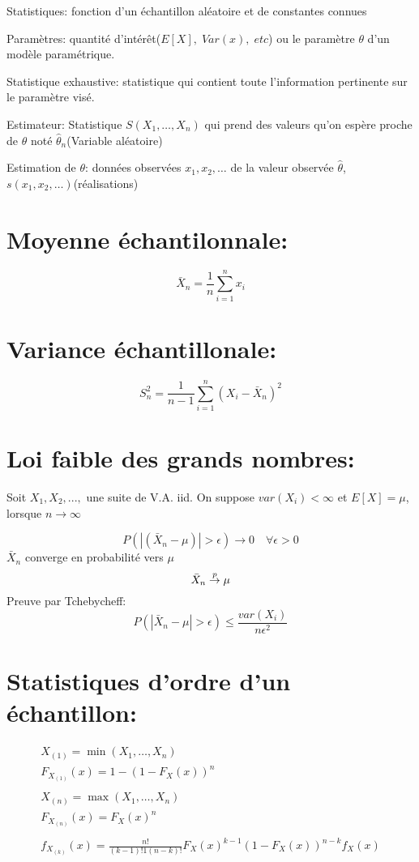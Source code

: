 \documentclass[]{book}
\theoremstyle{definition}
\theoremstyle{definition}
\theoremstyle{definition}
\theoremstyle{remark}
\begin{document}
Statistiques: fonction d'un échantillon aléatoire et de constantes
connues

Paramètres: quantité d'intérêt(\(E[X],\;Var(x),\;etc\)) ou le paramètre
\(\theta\) d'un modèle paramétrique.

Statistique exhaustive: statistique qui contient toute l'information
pertinente sur le paramètre visé.

Estimateur: Statistique \(S(X_1,\dots,X_n)\) qui prend des valeurs qu'on
espère proche de \(\theta\) noté \(\hat{\theta}_n\)(Variable aléatoire)

Estimation de \(\theta\): données observées \(x_1,x_2,\dots\) de la
valeur observée \(\hat{\theta}\), \(s(x_1,x_2,\dots)\)(réalisations)

\section{Moyenne échantilonnale:}\label{moyenne-echantilonnale}

\[
\bar{X}_n=\frac{1}{n}\sum_{i=1}^n x_i
\]

\section{Variance échantillonale:}\label{variance-echantillonale}

\[
S^2_n= \frac{1}{n-1}\sum^n_{i=1}\left(X_i-\bar{X}_n\right)^2
\]

\section{Loi faible des grands
nombres:}\label{loi-faible-des-grands-nombres}

Soit \(X_1,X_2,...,\) une suite de V.A. iid. On suppose
\(var(X_i)< \infty\) et \(E[X] = \mu\), lorsque \(n \to \infty\)

\[ 
P\left(|\left(\bar{X}_n-\mu\right)|>\epsilon\right)\to 0\quad \forall\epsilon>0
\] \(\bar{X}_n\) converge en probabilité vers \(\mu\) \[
\bar{X}_n\overset{p}\to\mu\\  
\] Preuve par Tchebycheff: \[
P\left(|\bar{X}_n-\mu|>\epsilon\right)\leq\frac{var(X_i)}{n\epsilon^2}
\]

\section{Statistiques d'ordre d'un
échantillon:}\label{statistiques-dordre-dun-echantillon}

\begin{gather*}
    X_{(1)}=\min(X_1,\dots, X_n) \\  
    F_{X_{(1)}} (x)= 1 -{(1- F_X (x))}^n \\  
    \\
    X_{(n)}= \max(X_1,\dots,X_n) \\  
    F_{X_{(n)}}(x)={F_X(x)}^n\\
    \\
    f_{X_{(k)}}(x)= \frac{{n!}}{{(k-1)!}1{(n-k)!}}{F_X(x)}^{k-1}{(1-F_X(x))}^{n-k}f_X(x)
\end{gather*}
\end{document}
